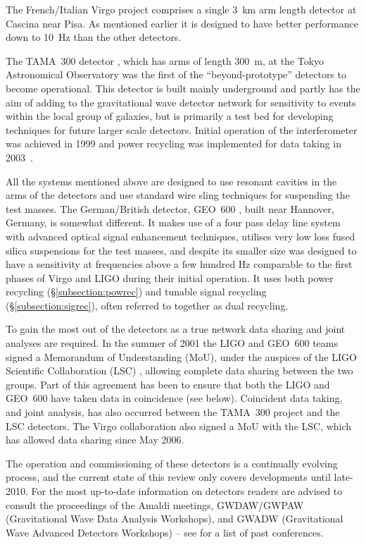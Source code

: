 \documentclass{article}
\begin{document}
The French/Italian Virgo project \cite{Virgoweb} comprises a single 3~km arm
length detector at Cascina near Pisa. As mentioned earlier it is designed to
have better performance down to 10~Hz than the other detectors.

The TAMA~300 detector \cite{TAMAweb}, which has arms of length 300~m, at the
Tokyo Astronomical Observatory was the first of the ``beyond-prototype''
detectors to become operational. This detector is built mainly underground and
partly has the aim of adding to the gravitational wave detector network for
sensitivity to events within the local group of galaxies, but is primarily a
test bed for developing techniques for future larger scale detectors. Initial
operation of the interferometer was achieved in 1999 and power recycling was
implemented for data taking in 2003~\cite{Arai:2003}.

All the systems mentioned above are designed to use resonant cavities in the
arms of the detectors and use standard wire sling techniques for suspending the
test masses. The German/British detector, GEO~600 \cite{GEOweb}, built near
Hannover, Germany, is somewhat different. It makes use of a four pass delay line
system with advanced optical signal enhancement techniques, utilises very low
loss fused silica suspensions for the test masses, and despite its smaller size 
was designed to have a sensitivity at frequencies above a few hundred Hz
comparable to the first phases of Virgo and LIGO during their initial operation.
It uses both power recycling (\S\ref{subsection:powrec}) and tunable signal
recycling (\S\ref{subsection:sigrec}), often referred to together as dual
recycling.

To gain the most out of the detectors as a true network data sharing and joint
analyses are required. In the summer of 2001 the LIGO and GEO~600 teams signed a
Memorandum of Understanding (MoU), under the auspices of the LIGO Scientific
Collaboration (LSC) \cite{LSCweb}, allowing complete data sharing between the
two groups. Part of this agreement has been to ensure that both the LIGO and
GEO~600 have taken data in coincidence (see below). Coincident data taking, and
joint analysis, has also occurred between the TAMA~300 project and the LSC
detectors. The Virgo collaboration also signed a MoU with the LSC, which has
allowed data sharing since May 2006.

The operation and commissioning of these detectors is a continually evolving
process, and the current state of this review only covers developments until
late-2010. For the most up-to-date information on detectors readers are advised
to consult the proceedings of the Amaldi meetings, GWDAW/GWPAW (Gravitational
Wave Data Analysis Workshops), and GWADW (Gravitational Wave Advanced Detectors
Workshops) -- see \cite{confs} for a list of past conferences.
\end{document}
